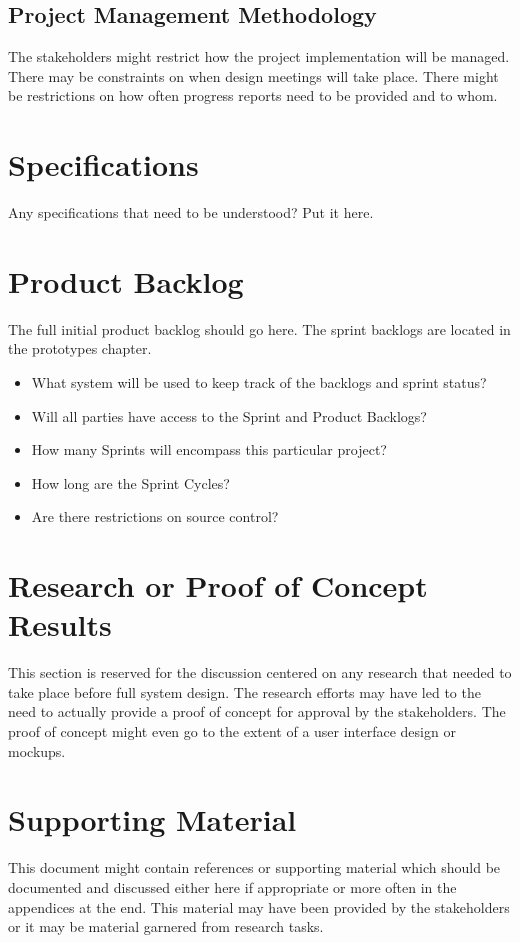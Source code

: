 \subsection{Project  Management Methodology}
The stakeholders might restrict how the project implementation will be managed. 
 There may be constraints on when design meetings will take place.  There might 
be restrictions on how often progress reports need to be provided and to whom. 


\section{Specifications}
Any specifications that need to be understood?  Put it here.  

\section{Product Backlog}
The full initial product backlog should go here.  The sprint backlogs are located in the prototypes chapter.

 
\begin{itemize}
\item What system will be used to keep track of the backlogs and sprint status?
\item Will all parties have access to the Sprint and Product Backlogs?
\item How many Sprints will encompass this particular project?
\item How long are the Sprint Cycles?
\item Are there restrictions on source control? 
\end{itemize}


\section{Research or Proof of Concept Results}
This section is reserved for the discussion centered on any research that needed 
to take place before full system design.  The research efforts may have led to 
the need to actually provide a proof of concept for approval by the stakeholders. 
 The proof of concept might even go to the extent of a user interface design or 
mockups. 


\section{Supporting Material}


This document might contain references or supporting material which should be documented 
and discussed  either here if appropriate or more often in the appendices at the end.  This material may have been provided by the stakeholders  
or it may be material garnered from research tasks.


